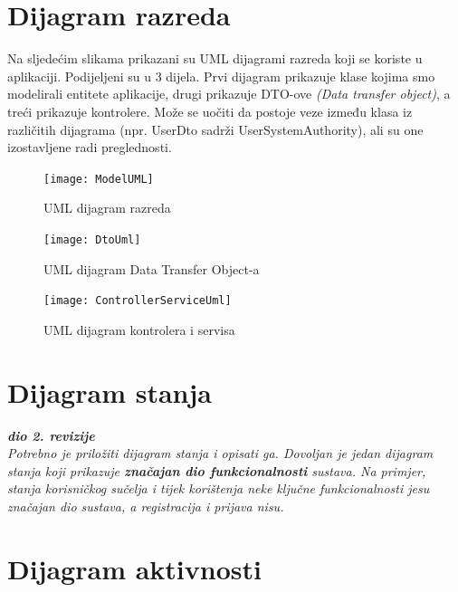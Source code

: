 			
		\section{Dijagram razreda}
		
			Na sljedećim slikama prikazani su UML dijagrami razreda koji se koriste u aplikaciji. Podijeljeni su u 3 dijela. Prvi dijagram prikazuje klase kojima smo modelirali entitete aplikacije, drugi prikazuje DTO-ove \textit{(Data transfer object)}, a treći prikazuje kontrolere. Može se uočiti da postoje veze između klasa iz različitih dijagrama (npr. UserDto sadrži UserSystemAuthority), ali su one izostavljene radi preglednosti.
			
			\begin{figure}[H]
				\texttt{[image: ModelUML]} %
				\centering
				\caption{UML dijagram razreda}
				\label{fig:modelUml}
			\end{figure}
			\begin{figure}[H]
				\texttt{[image: DtoUml]} %
				\centering
				\caption{UML dijagram Data Transfer Object-a}
				\label{fig:dtouml}
			\end{figure}
			\begin{figure}[H]
				\texttt{[image: ControllerServiceUml]} %
				\centering
				\caption{UML dijagram kontrolera i servisa}
				\label{fig:controllersServicesUml}
		\end{figure}
		
	
	\iffalse %
	
		\section{Dijagram stanja}
			
			\textbf{\textit{dio 2. revizije}}\\
			
			\textit{Potrebno je priložiti dijagram stanja i opisati ga. Dovoljan je jedan dijagram stanja koji prikazuje \textbf{značajan dio funkcionalnosti} sustava. Na primjer, stanja korisničkog sučelja i tijek korištenja neke ključne funkcionalnosti jesu značajan dio sustava, a registracija i prijava nisu. }
			
			\eject 
		
		\section{Dijagram aktivnosti}
			
